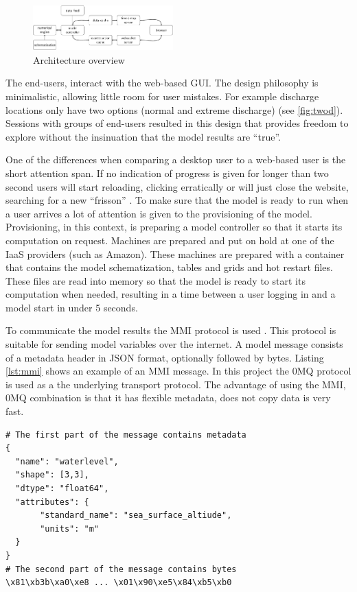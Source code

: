 \documentclass[a4paper]{article}
\begin{document}
\begin{figure}
  \centering
  \vspace{-20pt}
  \includegraphics[width=0.48\textwidth]{arch}
  \caption{Architecture overview}
  \label{fig:arch}
\end{figure}

The end-users, interact with the web-based \ac{GUI}. The design philosophy is minimalistic, allowing little room for user mistakes. For example discharge locations only have two options (normal and extreme discharge) (see \autoref{fig:twod}). Sessions with groups of end-users resulted in this design that provides freedom to explore without the insinuation that the model results are ``true''.

One of the differences when comparing a desktop user to a web-based user is the short attention span. If no indication of progress is given for longer than two second users will start reloading, clicking erratically or will just close the website, searching for a new ``frisson'' \citep{Carr2011}. To make sure that the model is ready to run when a user arrives a lot of attention is given to the provisioning of the model. Provisioning, in this context, is preparing a model controller so that it starts its computation on request. Machines are prepared and put on hold at one of the \ac{IaaS} providers (such as Amazon). These machines are prepared with a container that contains the model schematization, tables and grids and hot restart files. These files are read into memory so that the model is ready to start its computation when needed, resulting in a time between a user logging in and a model start in under 5 seconds.

To communicate the model results the \ac{MMI} protocol is used \citep{Baart2014a}. This protocol is suitable for sending model variables over the internet. A model message consists of a metadata header in \ac{JSON} format, optionally followed by bytes. Listing \ref{lst:mmi} shows an example of an \ac{MMI} message. In this project the \ac{0MQ} protocol is used as a the underlying transport protocol. The advantage of using the \ac{MMI}, \ac{0MQ} combination is that it has flexible metadata, does not copy data is very fast.

\begin{lstlisting}[caption=MMI message,label=lst:mmi]
# The first part of the message contains metadata
{
  "name": "waterlevel",
  "shape": [3,3],
  "dtype": "float64",
  "attributes": {
       "standard_name": "sea_surface_altiude",
       "units": "m"
  }
}
# The second part of the message contains bytes
\x81\xb3b\xa0\xe8 ... \x01\x90\xe5\x84\xb5\xb0
\end{lstlisting}
\end{document}
